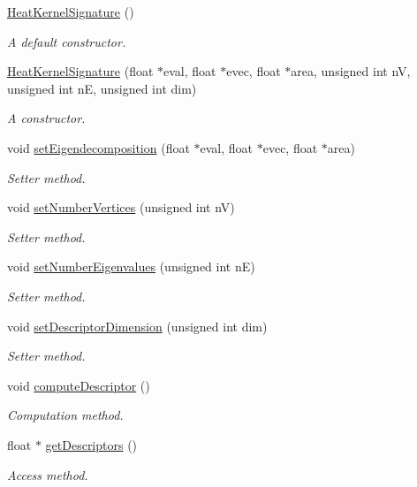 \begin{DoxyCompactItemize}
\item 
\hyperlink{classHeatDiffusion_1_1Descriptor_1_1HeatKernelSignature_a3f797757a74d5c4e8adbf9bebf6c1366}{Heat\-Kernel\-Signature} ()
\begin{DoxyCompactList}\small\item\em A default constructor. \end{DoxyCompactList}\item 
\hyperlink{classHeatDiffusion_1_1Descriptor_1_1HeatKernelSignature_afcfe0b7bbff43b8a0c6b27d79b63d3b2}{Heat\-Kernel\-Signature} (float $\ast$eval, float $\ast$evec, float $\ast$area, unsigned int n\-V, unsigned int n\-E, unsigned int dim)
\begin{DoxyCompactList}\small\item\em A constructor. \end{DoxyCompactList}\item 
void \hyperlink{classHeatDiffusion_1_1Descriptor_1_1HeatKernelSignature_a00767739e45f43e866d3d160181cf803}{set\-Eigendecomposition} (float $\ast$eval, float $\ast$evec, float $\ast$area)
\begin{DoxyCompactList}\small\item\em Setter method. \end{DoxyCompactList}\item 
void \hyperlink{classHeatDiffusion_1_1Descriptor_1_1HeatKernelSignature_a3586d97e950141d8da4322e8141e2dfe}{set\-Number\-Vertices} (unsigned int n\-V)
\begin{DoxyCompactList}\small\item\em Setter method. \end{DoxyCompactList}\item 
void \hyperlink{classHeatDiffusion_1_1Descriptor_1_1HeatKernelSignature_a260a5802bdc9d63169fe8fbc2044a713}{set\-Number\-Eigenvalues} (unsigned int n\-E)
\begin{DoxyCompactList}\small\item\em Setter method. \end{DoxyCompactList}\item 
void \hyperlink{classHeatDiffusion_1_1Descriptor_1_1HeatKernelSignature_af665db0249235e92cc3a5e1adcaf37a5}{set\-Descriptor\-Dimension} (unsigned int dim)
\begin{DoxyCompactList}\small\item\em Setter method. \end{DoxyCompactList}\item 
void \hyperlink{classHeatDiffusion_1_1Descriptor_1_1HeatKernelSignature_a4c89ad438f3491a69ed6b6bc2fbafafe}{compute\-Descriptor} ()
\begin{DoxyCompactList}\small\item\em Computation method. \end{DoxyCompactList}\item 
float $\ast$ \hyperlink{classHeatDiffusion_1_1Descriptor_1_1HeatKernelSignature_abd2e471c77597814da7c1f4617e8002d}{get\-Descriptors} ()
\begin{DoxyCompactList}\small\item\em Access method. \end{DoxyCompactList}\end{DoxyCompactItemize}
